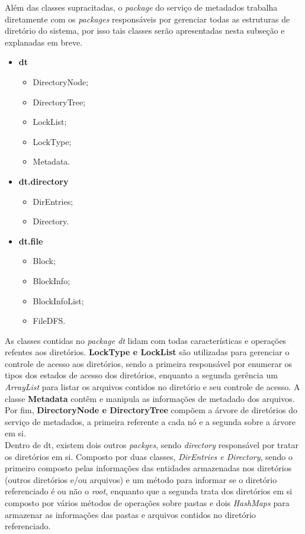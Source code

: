 Além das classes supracitadas, o \textit{package} do serviço de metadados trabalha diretamente com os \textit{packages} responsáveis por gerenciar todas as estruturas de diretório do sistema, por isso tais classes serão apresentadas nesta subseção e explanadas em breve.
\\

\begin{itemize}
	\item \textbf{dt}
	\begin{itemize}
		\item DirectoryNode;
		\item DirectoryTree;
		\item LockList;
		\item LockType;
		\item Metadata.
	\end{itemize}
	\item \textbf{dt.directory}
	\begin{itemize}
		\item DirEntries;
		\item Directory.
	\end{itemize}
	\item \textbf{dt.file}
	\begin{itemize}
		\item Block;
		\item BlockInfo;
		\item BlockInfoList;
		\item FileDFS.
	\end{itemize}
\end{itemize}

As classes contidas no \textit{package dt} lidam com todas características e operações refentes aos diretórios. \textbf{LockType e LockList} são utilizadas para gerenciar o controle de acesso aos diretórios, sendo a primeira responsável por enumerar os tipos dos estados de acesso dos diretórios, enquanto a segunda gerência um \textit{ArrayList} para listar os arquivos contidos no diretório e seu controle de acesso. A classe \textbf{Metadata} contêm e manipula as informações de metadado dos arquivos. Por fim, \textbf{DirectoryNode e DirectoryTree} compõem a árvore de diretórios do serviço de metadados, a primeira referente a cada nó e a segunda sobre a árvore em si.
\\

Dentro de dt, existem dois outros \textit{packges}, sendo \textit{directory} responsável por tratar os diretórios em si. Composto por duas classes, \textit{DirEntries e Directory}, sendo o primeiro composto pelas informações das entidades armazenadas nos diretórios (outros diretórios e/ou arquivos) e um método para informar se o diretório referenciado é ou não o \textit{root}, enquanto que a segunda trata dos diretórios em si composto por vários métodos de operações sobre pastas e dois \textit{HashMaps} para armazenar as informações das pastas e arquivos contidos no diretório referenciado.
\\


